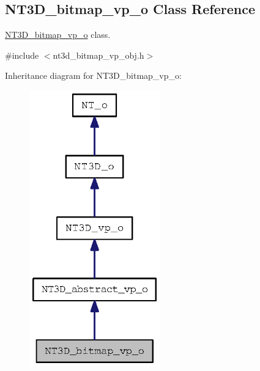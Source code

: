 \subsection{NT3D\_\-bitmap\_\-vp\_\-o Class Reference}
\label{class_n_t3_d__bitmap__vp__o}


\hyperlink{class_n_t3_d__bitmap__vp__o}{NT3D\_\-bitmap\_\-vp\_\-o} class.  




{\ttfamily \#include $<$nt3d\_\-bitmap\_\-vp\_\-obj.h$>$}



Inheritance diagram for NT3D\_\-bitmap\_\-vp\_\-o:
\nopagebreak
\begin{figure}[H]
\begin{center}
\leavevmode
\includegraphics[width=160pt]{class_n_t3_d__bitmap__vp__o__inherit__graph}
\end{center}
\end{figure}


